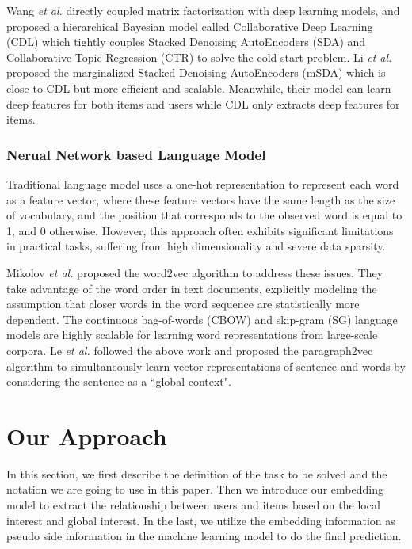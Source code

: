 \documentclass{sig-alternate-05-2015}
\begin{document}
Wang \textit{et al.} \cite{wang2015collaborative} 
directly coupled matrix factorization with deep learning models,
and proposed a hierarchical Bayesian model called
Collaborative Deep Learning (CDL)
which tightly couples Stacked Denoising AutoEncoders (SDA) and
Collaborative Topic Regression (CTR) to
solve the cold start problem.
Li \textit{et al.} \cite{li2015deep} proposed the
marginalized Stacked Denoising AutoEncoders (mSDA) which
is close to CDL but more efficient and scalable.
Meanwhile, their model can learn deep features for both items and users
while CDL only extracts deep features for items.

\subsubsection{Nerual Network based Language Model}
Traditional language model uses a one-hot representation
to represent each word as a feature vector,
where these feature vectors have the same length
as the size of vocabulary, and the position that
corresponds to the observed word is equal to 1, and 0 otherwise.
However, this approach often exhibits significant limitations in practical tasks,
suffering from high dimensionality and severe data sparsity.

Mikolov \textit{et al.} \cite{mikolov2013efficient, mikolov2013distributed}
proposed the word2vec algorithm to address these issues.
They take advantage of the word order in text documents,
explicitly modeling the assumption that closer words
in the word sequence are statistically more dependent.
The continuous bag-of-words (CBOW) and skip-gram (SG)
language models are highly scalable for learning word
representations from large-scale corpora.
Le \textit{et al.} \cite{le2014distributed} followed the above
work and proposed the paragraph2vec algorithm to simultaneously
learn vector representations of sentence and words
by considering the sentence as a ``global context".

\section{Our Approach}
In this section,
we first describe the definition of the task to be solved and
the notation we are going to use in this paper. 
Then we introduce our embedding model to extract the relationship
between users and items based on the local interest and global interest.
In the last, we utilize the embedding information as pseudo side information
in the machine learning model to do the final prediction.
\end{document}
